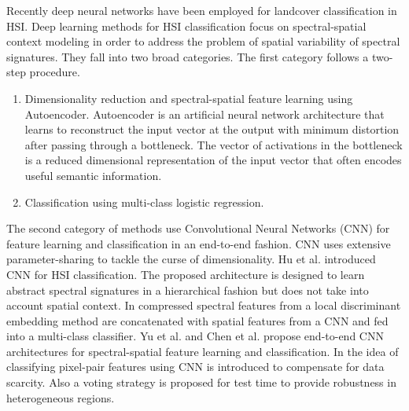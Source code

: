 \documentclass[journal]{IEEEtran}
\begin{document}
Recently deep neural networks \cite{LeCun:2015,Goodfellow:2016} have been employed for landcover classification in HSI. Deep learning methods for HSI classification \cite{Zhang:2016} focus on spectral-spatial context modeling in order to address the problem of spatial variability of spectral signatures. They fall into two broad categories. The first category \cite{Chen:2014,Ma:2015,Chen:2015,Zhang:2015,Ma:2016} follows a two-step procedure.
\begin{enumerate}
\item Dimensionality reduction and spectral-spatial feature learning using Autoencoder. Autoencoder \cite{Hinton:2006} is an artificial neural network architecture that learns to reconstruct the input vector at the output with minimum distortion after passing through a bottleneck. The vector of activations in the bottleneck is a reduced dimensional representation of the input vector that often encodes useful semantic information.
\item Classification using multi-class logistic regression.
\end{enumerate}
The second category of methods use Convolutional Neural Networks (CNN) \cite{LeCun:1998,Goodfellow:2016} for feature learning and classification in an end-to-end fashion. CNN uses extensive parameter-sharing to tackle the curse of dimensionality. Hu et al. \cite{Hu:2015} introduced CNN for HSI classification. The proposed architecture is designed to learn abstract spectral signatures in a hierarchical fashion but does not take into account spatial context. In \cite{Zhao:2016} compressed spectral features from a local discriminant embedding method are concatenated with spatial features from a CNN and fed into a multi-class classifier. Yu et al.\cite{Yu:2016} and Chen et al.\cite{Chen:2016} propose end-to-end CNN architectures for spectral-spatial feature learning and classification. In \cite{Li:2016}  the idea of classifying pixel-pair features using CNN is introduced to compensate for data scarcity. Also a voting strategy is proposed for test time to provide robustness in heterogeneous regions. \\
\end{document}
